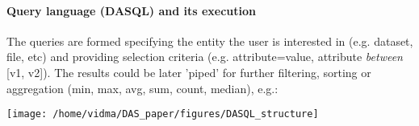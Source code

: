 \paragraph{Query language (DASQL) and its execution}

The queries are formed specifying the entity the user is interested
in (e.g. dataset, file, etc) and providing selection criteria (e.g.
attribute=value, attribute \emph{between} {[}v1, v2{]}). The results
could be later 'piped' for further filtering, sorting or aggregation
(min, max, avg, sum, count, median), e.g.: 

\texttt{[image: /home/vidma/DAS\_paper/figures/DASQL\_structure]}%
